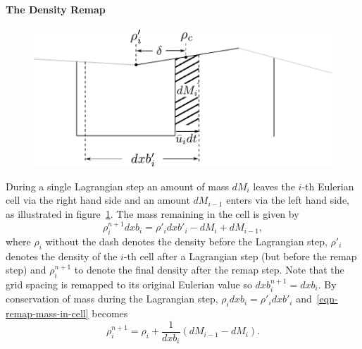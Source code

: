 \paragraph{The Density Remap}

\begin{figure}[t]
  \centering
  \includegraphics[width=0.7\linewidth]{mass_movement.pdf}
  \label{fig:mass_movement}
\end{figure}

During a single Lagrangian step an amount of mass $dM_i$ leaves the $i$-th Eulerian cell via the right hand side and an amount $dM_{i-1}$ enters via the left hand side, as illustrated in figure~\ref{fig:mass_movement}. The mass remaining in the cell is given by
\begin{equation}
  \rho^{n+1}_i dxb_i = \rho'_i dxb'_i - dM_i + dM_{i-1},
  \label{eqn-remap-mass-in-cell}
\end{equation}
where $\rho_i$ without the dash denotes the density before the Lagrangian step, $\rho'_i$ denotes the density of the $i$-th cell after a Lagrangian step (but before the remap step) and $\rho_i^{n+1}$ to denote the final density after the remap step. Note that the grid spacing is remapped to its original Eulerian value so $dxb^{n+1}_i = dxb_i$. By conservation of mass during the Lagrangian step, $\rho_i dxb_i = \rho'_i dxb'_i$ and~\eqref{eqn-remap-mass-in-cell} becomes
\begin{equation}
  \rho^{n+1}_i = \rho_i + \frac{1}{dxb_i} (dM_{i-1} - dM_i).
  \label{eqn-remap-density}
\end{equation}


